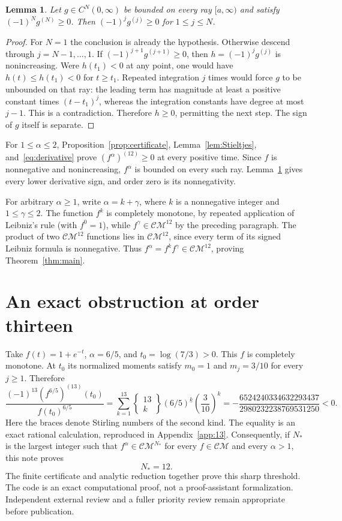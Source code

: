 \documentclass[11pt]{article}
\newtheorem{lemma}[theorem]{Lemma}
\newcommand{\CM}{\mathcal{CM}}
\newcommand{\fall}[2]{#1^{\underline{#2}}}
\begin{document}
\begin{lemma}\label{lem:descending}
Let $g\in C^N(0,\infty)$ be bounded on every ray $[a,\infty)$ and satisfy
$(-1)^Ng^{(N)}\ge0$. Then $(-1)^jg^{(j)}\ge0$ for $1\le j\le N$.
\end{lemma}
\begin{proof}
For $N=1$ the conclusion is already the hypothesis. Otherwise descend through
$j=N-1,\ldots,1$. If $(-1)^{j+1}g^{(j+1)}\ge0$, then
$h=(-1)^jg^{(j)}$ is nonincreasing. Were $h(t_1)<0$ at any point, one would
have $h(t)\le h(t_1)<0$ for $t\ge t_1$. Repeated integration $j$ times
would force $g$ to be unbounded on that ray: the leading term has magnitude
at least a positive constant times $(t-t_1)^j$, whereas the integration
constants have degree at most $j-1$. This is a contradiction. Therefore
$h\ge0$, permitting the next step. The sign of $g$ itself is separate.
\end{proof}

For $1\le\alpha\le2$, Proposition~\ref{prop:certificate},
Lemma~\ref{lem:Stieltjes}, and~\eqref{eq:derivative} prove
$(f^\alpha)^{(12)}\ge0$ at every positive time. Since $f$ is
nonnegative and nonincreasing, $f^\alpha$ is bounded on every such ray.
Lemma~\ref{lem:descending} gives every lower derivative sign, and order zero
is its nonnegativity.

For arbitrary $\alpha\ge1$, write $\alpha=k+\gamma$, where $k$ is a
nonnegative integer and $1\le\gamma\le2$. The function $f^k$ is completely
monotone, by repeated application of Leibniz's rule (with $f^0=1$), while
$f^\gamma\in\CM^{12}$ by the preceding paragraph. The product of two
$\CM^{12}$ functions lies in $\CM^{12}$, since every term of its signed
Leibniz formula is nonnegative. Thus $f^\alpha=f^kf^\gamma\in\CM^{12}$,
proving Theorem~\ref{thm:main}.

\section{An exact obstruction at order thirteen}

Take $f(t)=1+e^{-t}$, $\alpha=6/5$, and $t_0=\log(7/3)>0$.
This $f$ is completely monotone. At $t_0$ its normalized moments satisfy
$m_0=1$ and $m_j=3/10$ for every $j\ge1$. Therefore
\[
\frac{(-1)^{13}(f^{6/5})^{(13)}(t_0)}{f(t_0)^{6/5}}
=\sum_{k=1}^{13}\left\{\!\begin{matrix}13\\k\end{matrix}\!\right\}
\fall{(6/5)}{k}\left(\frac3{10}\right)^k
=-\frac{6524240334632293437}{2980232238769531250}<0.
\]
Here the braces denote Stirling numbers of the second kind. The equality is
an exact rational calculation, reproduced in Appendix~\ref{app:13}.
Consequently, if $N_*$ is the largest integer such that
$f^\alpha\in\CM^{N_*}$ for every $f\in\CM$ and every $\alpha>1$, this note proves
\[
N_*=12.
\]
The finite certificate and analytic reduction together prove this sharp
threshold. The code is an exact computational proof, not a proof-assistant
formalization. Independent external review and a fuller priority review remain
appropriate before publication.
\end{document}
